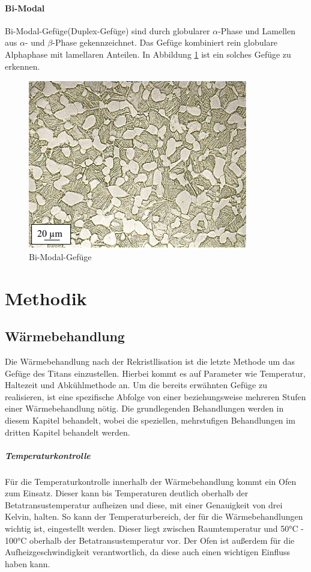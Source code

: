\documentclass[a4paper, 11pt]{tubsreprt}
\begin{document}
\subsubsection{Bi-Modal}
Bi-Modal-Gefüge(Duplex-Gefüge) sind durch globularer $\alpha$-Phase und Lamellen aus $\alpha$- und $\beta$-Phase gekennzeichnet. Das Gefüge kombiniert rein globulare Alphaphase mit lamellaren Anteilen. In Abbildung \ref{bimodal} ist ein solches Gefüge zu erkennen. 
\begin{figure}
\centering
\includegraphics[scale=1]{Bilder/Duplexgefuege.PNG}
\caption[Bi-Modal-Gefüge]{Bi-Modal-Gefüge\cite{Werkstoffdesign2012}}
\label{bimodal}
\end{figure}

\chapter{Methodik}
\section{Wärmebehandlung}

Die Wärmebehandlung nach der Rekristllisation ist die letzte Methode um das Gefüge des Titans einzustellen. Hierbei kommt es auf Parameter wie Temperatur, Haltezeit und Abkühlmethode an. Um die bereits erwähnten Gefüge zu realisieren, ist eine spezifische Abfolge von einer beziehungsweise mehreren Stufen einer Wärmebehandlung nötig. Die grundlegenden Behandlungen werden in diesem Kapitel behandelt, wobei die speziellen, mehrstufigen Behandlungen im dritten Kapitel behandelt werden.
\paragraph{Temperaturkontrolle}
Für die Temperaturkontrolle innerhalb der Wärmebehandlung kommt ein Ofen zum Einsatz. Dieser kann bis Temperaturen deutlich oberhalb der Betatransustemperatur aufheizen und diese, mit einer Genauigkeit von drei Kelvin, halten. So kann der Temperaturbereich, der für die Wärmebehandlungen wichtig ist, eingestellt werden. Dieser liegt zwischen Raumtemperatur und 50°C - 100°C oberhalb der Betatransustemperatur vor. Der Ofen ist außerdem für die Aufheizgeschwindigkeit verantwortlich, da diese auch einen wichtigen Einfluss haben kann.
\end{document}
